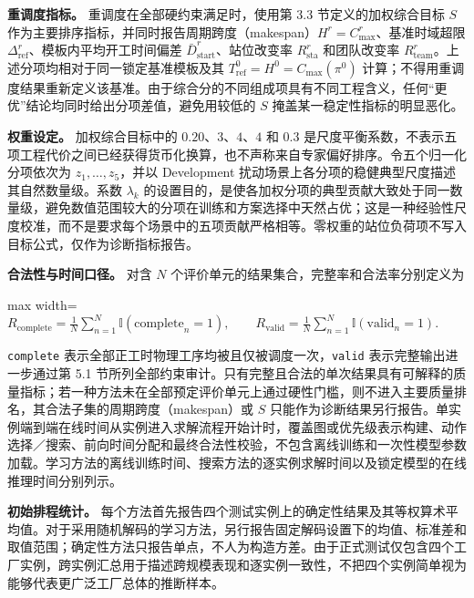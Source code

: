 \documentclass[journal,10pt]{IEEEtran}
\begin{document}
\textbf{重调度指标。} 重调度在全部硬约束满足时，使用第 3.3 节定义的加权综合目标 \(S\) 作为主要排序指标，并同时报告周期跨度（makespan）\(H^r=C_{\max}^{r}\)、基准时域超限 \(\Delta_{\mathrm{ref}}^r\)、模板内平均开工时间偏差 \(\bar D_{\mathrm{start}}^r\)、站位改变率 \(R_{\mathrm{sta}}^r\) 和团队改变率 \(R_{\mathrm{team}}^r\)。上述分项均相对于同一锁定基准模板及其 \(T_{\mathrm{ref}}^0=H^0=C_{\max}(\pi^0)\) 计算；不得用重调度结果重新定义该基准。由于综合分的不同组成项具有不同工程含义，任何``更优''结论均同时给出分项差值，避免用较低的 \(S\) 掩盖某一稳定性指标的明显恶化。

\textbf{权重设定。} 加权综合目标中的 \(0.20\)、\(3\)、\(4\)、\(4\) 和 \(0.3\) 是尺度平衡系数，不表示五项工程代价之间已经获得货币化换算，也不声称来自专家偏好排序。令五个归一化分项依次为 \(z_1,\ldots,z_5\)，并以 Development 扰动场景上各分项的稳健典型尺度描述其自然数量级。系数 \(\lambda_k\) 的设置目的，是使各加权分项的典型贡献大致处于同一数量级，避免数值范围较大的分项在训练和方案选择中天然占优；这是一种经验性尺度校准，而不是要求每个场景中的五项贡献严格相等。零权重的站位负荷项不写入目标公式，仅作为诊断指标报告。

\textbf{合法性与时间口径。} 对含 \(N\) 个评价单元的结果集合，完整率和合法率分别定义为

\begin{center}
\begin{adjustbox}{max width=\columnwidth}
$\displaystyle
R_{\mathrm{complete}}=
\frac{1}{N}\sum_{n=1}^{N}\mathbb I(\mathrm{complete}_n=1),
\qquad
R_{\mathrm{valid}}=
\frac{1}{N}\sum_{n=1}^{N}\mathbb I(\mathrm{valid}_n=1).
$
\end{adjustbox}
\end{center}

\texttt{complete} 表示全部正工时物理工序均被且仅被调度一次，\texttt{valid} 表示完整输出进一步通过第 5.1 节所列全部约束审计。只有完整且合法的单次结果具有可解释的质量指标；若一种方法未在全部预定评价单元上通过硬性门槛，则不进入主要质量排名，其合法子集的周期跨度（makespan）或 \(S\) 只能作为诊断结果另行报告。单实例端到端在线时间从实例进入求解流程开始计时，覆盖图或优先级表示构建、动作选择／搜索、前向时间分配和最终合法性校验，不包含离线训练和一次性模型参数加载。学习方法的离线训练时间、搜索方法的逐实例求解时间以及锁定模型的在线推理时间分别列示。

\textbf{初始排程统计。} 每个方法首先报告四个测试实例上的确定性结果及其等权算术平均值。对于采用随机解码的学习方法，另行报告固定解码设置下的均值、标准差和取值范围；确定性方法只报告单点，不人为构造方差。由于正式测试仅包含四个工厂实例，跨实例汇总用于描述跨规模表现和逐实例一致性，不把四个实例简单视为能够代表更广泛工厂总体的推断样本。
\end{document}
